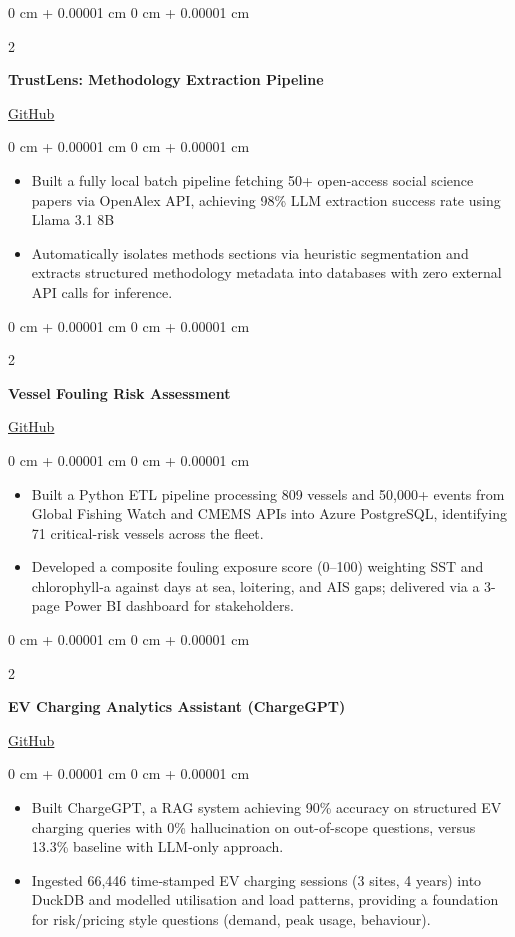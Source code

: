 \documentclass[10pt, letterpaper]{article}
\newenvironment{onecolentry}{
    \begin{adjustwidth}{
        0 cm + 0.00001 cm
    }{
        0 cm + 0.00001 cm
    }
}{
    \end{adjustwidth}
}
\newenvironment{twocolentry}[2][]{
    \onecolentry
    \def\secondColumn{#2}
    \setcolumnwidth{\fill, 4.5 cm}
    \begin{paracol}{2}
}{
    \switchcolumn \raggedleft \secondColumn
    \end{paracol}
    \endonecolentry
}
\begin{document}
\begin{twocolentry}{
    \href{https://github.com/NguyenIslandBoy/TrustLens}{GitHub}
    }
\textbf{TrustLens: Methodology Extraction Pipeline}
\end{twocolentry}
\begin{onecolentry}
\begin{itemize}
    \item Built a fully local batch pipeline fetching 50+ open-access social science papers via OpenAlex API, achieving 98\% LLM extraction success rate using Llama 3.1 8B
    \item Automatically isolates methods sections via heuristic segmentation and extracts structured methodology metadata into databases with zero external API calls for inference.
\end{itemize}
\end{onecolentry}
\vspace{0.15cm}
\begin{twocolentry}{
    \href{https://github.com/NguyenIslandBoy/Vessel-Fouling-Risk-Assessment}{GitHub}
    }
\textbf{Vessel Fouling Risk Assessment}
\end{twocolentry}
\begin{onecolentry}
\begin{itemize}
    \item Built a Python ETL pipeline processing 809 vessels and 50,000+ events from Global Fishing Watch and CMEMS APIs into Azure PostgreSQL, identifying 71 critical-risk vessels across the fleet.
    \item Developed a composite fouling exposure score (0–100) weighting SST and chlorophyll-a against days at sea, loitering, and AIS gaps; delivered via a 3-page Power BI dashboard for stakeholders.
\end{itemize}
\end{onecolentry}
\vspace{0.15cm}
\begin{twocolentry}{
    \href{https://github.com/NguyenIslandBoy/EV-RAG-Chatbot-ChargeGPT-Prototype}{GitHub}
    }
\textbf{EV Charging Analytics Assistant (ChargeGPT)}
\end{twocolentry}
\begin{onecolentry}
\begin{itemize}
    \item Built ChargeGPT, a RAG system achieving 90\% accuracy on structured EV charging queries with 0\% hallucination on out-of-scope questions, versus 13.3\% baseline with LLM-only approach.
    \item Ingested 66,446 time‑stamped EV charging sessions (3 sites, 4 years) into DuckDB and modelled utilisation and load patterns, providing a foundation for risk/pricing style questions (demand, peak usage, behaviour).
\end{itemize}
\end{onecolentry}
\vspace{0.15cm}
\end{document}
